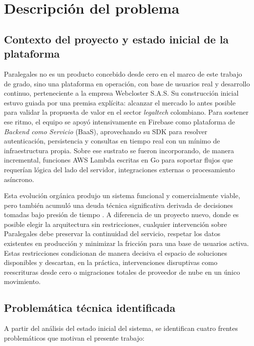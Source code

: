 \section{Descripción del problema}

\subsection{Contexto del proyecto y estado inicial de la plataforma}

Paralegales no es un producto concebido desde cero en el marco de este trabajo de grado, sino una plataforma en operación, con base de usuarios real y desarrollo continuo, perteneciente a la empresa Webcloster S.A.S. Su construcción inicial estuvo guiada por una premisa explícita: alcanzar el mercado lo antes posible para validar la propuesta de valor en el sector \textit{legaltech} colombiano. Para sostener ese ritmo, el equipo se apoyó intensivamente en Firebase como plataforma de \textit{Backend como Servicio} (BaaS), aprovechando su SDK para resolver autenticación, persistencia y consultas en tiempo real con un mínimo de infraestructura propia. Sobre ese sustrato se fueron incorporando, de manera incremental, funciones AWS Lambda escritas en Go para soportar flujos que requerían lógica del lado del servidor, integraciones externas o procesamiento asíncrono.

Esta evolución orgánica produjo un sistema funcional y comercialmente viable, pero también acumuló una deuda técnica significativa derivada de decisiones tomadas bajo presión de tiempo \cite{BirrEngwall2024}. A diferencia de un proyecto nuevo, donde es posible elegir la arquitectura sin restricciones, cualquier intervención sobre Paralegales debe preservar la continuidad del servicio, respetar los datos existentes en producción y minimizar la fricción para una base de usuarios activa. Estas restricciones condicionan de manera decisiva el espacio de soluciones disponibles y descartan, en la práctica, intervenciones disruptivas como reescrituras desde cero o migraciones totales de proveedor de nube en un único movimiento.

\subsection{Problemática técnica identificada}

A partir del análisis del estado inicial del sistema, se identifican cuatro frentes problemáticos que motivan el presente trabajo:

